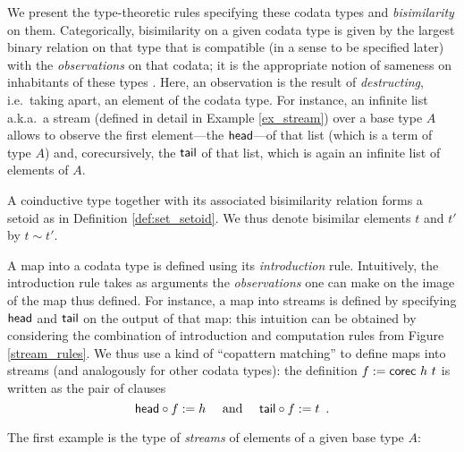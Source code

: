 \documentclass[a4paper,USenglish]{lipics}
\newcommand{\parencite}[1]{\cite{#1}}
\begin{document}
We present the type-theoretic rules specifying these codata types and \emph{bisimilarity} on them.
Categorically, bisimilarity on a given codata type is given by the largest binary relation on that type that is 
compatible (in a sense to be specified later) with the \emph{observations} on that codata; it is the appropriate notion of sameness on inhabitants of these types \parencite{DBLP:conf/types/Coquand93}.
Here, an observation is the result of \emph{destructing}, i.e.\ taking apart, an element of the codata type.
For instance, an infinite list a.k.a.\ a stream (defined in detail in Example \ref{ex_stream}) over a base type $A$ allows to observe the first element---the $\mathsf{head}$---of that list (which is a term of type $A$) and,
corecursively, the $\mathsf{tail}$ of that list, which is again an infinite list of elements of $A$.

A coinductive type together with its associated bisimilarity relation forms a setoid as in Definition \ref{def:set_setoid}.
We thus denote bisimilar elements $t$ and $t'$ by $t \sim t'$. 

A map into a codata type is defined using its \emph{introduction} rule.
Intuitively, the introduction rule takes as arguments the \emph{observations} one can make on the image of the map thus defined.
For instance, a map into streams is defined by specifying $\mathsf{head}$ and $\mathsf{tail}$ on the output of that map: this intuition
  can be obtained by considering the combination of introduction and computation rules from Figure \ref{stream_rules}.
  We thus use a kind of \enquote{copattern matching} \parencite{DBLP:conf/popl/AbelPTS13} to define maps into streams (and analogously for other codata types): 
  the definition $f := \mathsf{corec}~h~t$ is written as
  the pair of clauses 
   \[{\mathsf{head}} \circ {f} := h \quad \text{ and } \quad {\ensuremath{\mathsf{tail}}} \circ {f}:= t \enspace . \]


\noindent
The first example is the type of \emph{streams} of elements of a given base type $A$:
\end{document}
